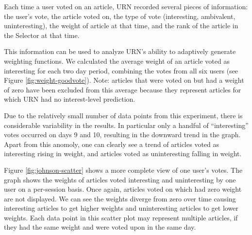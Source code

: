 Each time a user voted on an article, URN recorded several pieces of
information: the user's vote, the article voted on, the type of vote
(interesting, ambivalent, uninteresting), the weight of article at that time,
and the rank of the article in the Selector at that time.

This information can be used to analyze URN's ability to adaptively generate
weighting functions. We calculated the average weight of an article voted as
interesting for each two day period, combining the votes from all six users
(see Figure \ref{fig:weight-goodvote}). Note: articles that were voted on but
had a weight of zero have been excluded from this average because they
represent articles for which URN had no interest-level prediction.

\begin{figure*}[t]
  {\centerline{}}
  \caption{Weight of an article voted as interesting averaged over all
  users vs. time.  This graph combines together approximately 330 votes.}
  \label{fig:weight-goodvote}
\end{figure*}

Due to the relatively small number of data points from this experiment,
there is considerable variability in the results. In particular only a
handful of ``interesting'' votes occurred on days 9 and 10, resulting in
the downward trend in the graph. Apart from this anomoly, one can clearly
see a trend of articles voted as interesting rising in weight, and
articles voted as uninteresting falling in weight.

Figure \ref{fig:johnson-scatter} shows a more complete view of one user's
votes. The graph shows the weights of articles voted interesting and
uninteresting by one user on a per-session basis. Once again, articles
voted on which had zero weight are not displayed. We can see the weights
diverge from zero over time causing interesting articles to get higher
weights and uninteresting articles to get lower weights. Each data point in
this scatter plot may represent multiple articles, if they had the same
weight and were voted upon in the same day.

\begin{figure*}[t]
  {\centerline{}}
  \caption{A scatter plot of one user's voting behavior over the
  experimental period. Over time, interesting articles were more positively
  weighted, while uninteresting articles were more negatively weighted.}
  \label{fig:johnson-scatter}
\end{figure*}


